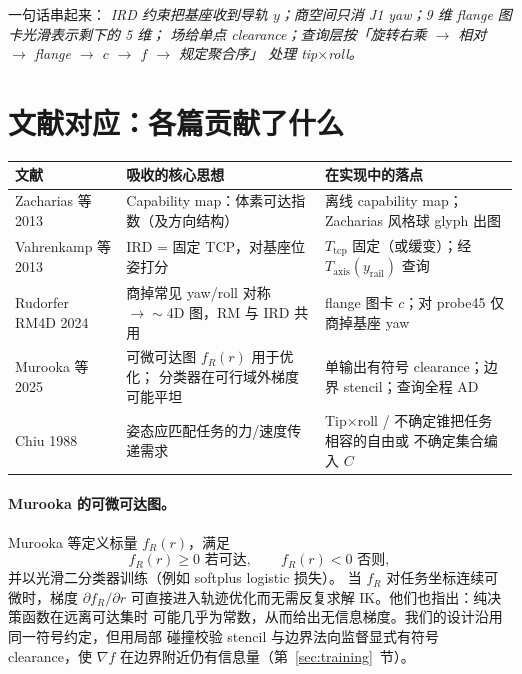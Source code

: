 \documentclass[UTF8,a4paper,11pt,fontset=fandol]{ctexart}
\newcommand{\Tcp}{T_{\mathrm{tcp}}}
\newcommand{\Taxis}{T_{\mathrm{axis}}}
\begin{document}
一句话串起来：
\emph{IRD 约束把基座收到导轨 \(y\)；商空间只消 J1 yaw；9 维 flange 图卡光滑表示剩下的 5 维；
场给单点 clearance；查询层按「旋转右乘 \(\to\) 相对 \(\to\) flange \(\to\) \(c\) \(\to\) \(f\) \(\to\) 规定聚合序」
处理 tip$\times$roll。}

\section{文献对应：各篇贡献了什么}
\label{sec:papers}

\begin{table}[h]
\centering
\begin{tabular}{@{}llp{6.6cm}@{}}
\toprule
文献 & 吸收的核心思想 & 在实现中的落点 \\
\midrule
Zacharias 等 2013
  & Capability map：体素可达指数（及方向结构）
  & 离线 capability map；Zacharias 风格球 glyph 出图 \\
Vahrenkamp 等 2013
  & IRD = 固定 TCP，对基座位姿打分
  & \(\Tcp\) 固定（或缓变）；经 \(\Taxis(y_{\mathrm{rail}})\) 查询 \\
Rudorfer RM4D 2024
  & 商掉常见 yaw/roll 对称 $\to\sim$4D 图，RM 与 IRD 共用
  & flange 图卡 \(c\)；对 probe45 仅商掉基座 yaw \\
Murooka 等 2025
  & 可微可达图 \(f_{R}(r)\) 用于优化；
    分类器在可行域外梯度可能平坦
  & 单输出有符号 clearance；边界 stencil；查询全程 AD \\
Chiu 1988
  & 姿态应匹配任务的力/速度传递需求
  & Tip$\times$roll / 不确定锥把任务相容的自由或
    不确定集合编入 \(C\) \\
\bottomrule
\end{tabular}
\end{table}

\paragraph{Murooka 的可微可达图。}
Murooka 等定义标量 \(f_{R}(r)\)，满足
\begin{equation}
\label{eq:murooka}
  f_{R}(r)\ge 0 \text{ 若可达},\qquad
  f_{R}(r)< 0 \text{ 否则},
\end{equation}
并以光滑二分类器训练（例如 softplus logistic 损失）。
当 \(f_{R}\) 对任务坐标连续可微时，梯度 \(\partial f_{R}/\partial r\)
可直接进入轨迹优化而无需反复求解 IK。他们也指出：纯决策函数在远离可达集时
可能几乎为常数，从而给出无信息梯度。我们的设计沿用同一符号约定，但用局部
碰撞校验 stencil 与边界法向监督显式有符号 clearance，使 \(\nabla f\)
在边界附近仍有信息量（第~\ref{sec:training}~节）。
\end{document}
